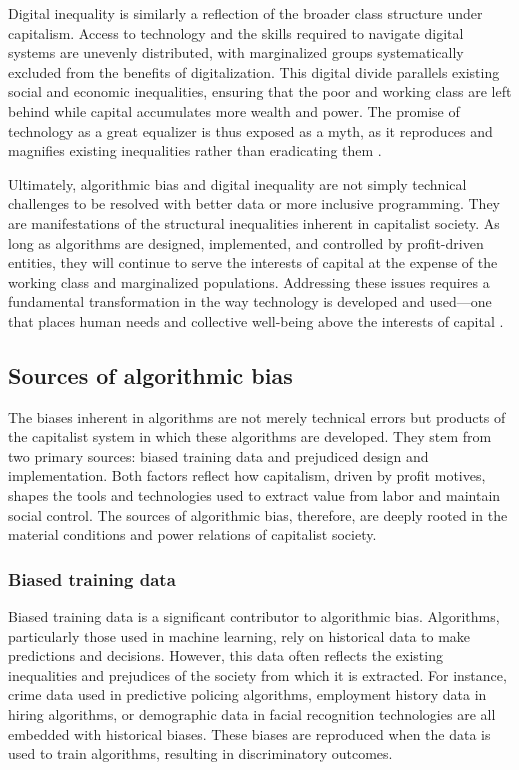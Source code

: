 \begin{refsection}
Digital inequality is similarly a reflection of the broader class structure under capitalism. Access to technology and the skills required to navigate digital systems are unevenly distributed, with marginalized groups systematically excluded from the benefits of digitalization. This digital divide parallels existing social and economic inequalities, ensuring that the poor and working class are left behind while capital accumulates more wealth and power. The promise of technology as a great equalizer is thus exposed as a myth, as it reproduces and magnifies existing inequalities rather than eradicating them \cite[pp.~42-44]{eubanks2018}.

Ultimately, algorithmic bias and digital inequality are not simply technical challenges to be resolved with better data or more inclusive programming. They are manifestations of the structural inequalities inherent in capitalist society. As long as algorithms are designed, implemented, and controlled by profit-driven entities, they will continue to serve the interests of capital at the expense of the working class and marginalized populations. Addressing these issues requires a fundamental transformation in the way technology is developed and used—one that places human needs and collective well-being above the interests of capital \cite[pp.~12-14]{birhane2021}.

\subsection{Sources of algorithmic bias}

The biases inherent in algorithms are not merely technical errors but products of the capitalist system in which these algorithms are developed. They stem from two primary sources: biased training data and prejudiced design and implementation. Both factors reflect how capitalism, driven by profit motives, shapes the tools and technologies used to extract value from labor and maintain social control. The sources of algorithmic bias, therefore, are deeply rooted in the material conditions and power relations of capitalist society.

\subsubsection{Biased training data}

Biased training data is a significant contributor to algorithmic bias. Algorithms, particularly those used in machine learning, rely on historical data to make predictions and decisions. However, this data often reflects the existing inequalities and prejudices of the society from which it is extracted. For instance, crime data used in predictive policing algorithms, employment history data in hiring algorithms, or demographic data in facial recognition technologies are all embedded with historical biases. These biases are reproduced when the data is used to train algorithms, resulting in discriminatory outcomes.


\end{refsection}
